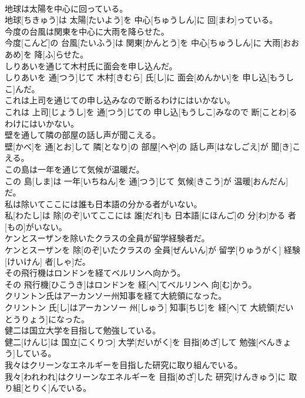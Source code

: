\documentclass[8pt]{extreport}
\begin{document}
\begin{CJK}{UTF8}{min}
\\	地球は太陽を中心に回っている。	
\\	地球[ちきゅう]は 太陽[たいよう]を 中心[ちゅうしん]に 回[まわ]っている。
\\	今度の台風は関東を中心に大雨を降らせた。	
\\	今度[こんど]の 台風[たいふう]は 関東[かんとう]を 中心[ちゅうしん]に 大雨[おおあめ]を 降[ふ]らせた。
\\	しりあいを通じて木村氏に面会を申し込んだ。	
\\	しりあいを 通[つう]じて 木村[きむら] 氏[し]に 面会[めんかい]を 申し込[もうしこ]んだ。
\\	これは上司を通じての申し込みなので断るわけにはいかない。	
\\	これは 上司[じょうし]を 通[つう]じての 申し込[もうしこ]みなので 断[ことわ]るわけにはいかない。
\\	壁を通して隣の部屋の話し声が聞こえる。	
\\	壁[かべ]を 通[とお]して 隣[となり]の 部屋[へや]の 話し声[はなしごえ]が 聞[き]こえる。
\\	この島は一年を通じて気候が温暖だ。	
\\	この 島[しま]は 一年[いちねん]を 通[つう]じて 気候[きこう]が 温暖[おんだん]だ。
\\	私は除いてここには誰も日本語の分かる者がいない。	
\\	私[わたし]は 除[のぞ]いてここには 誰[だれ]も 日本語[にほんご]の 分[わ]かる 者[もの]がいない。
\\	ケンとスーザンを除いたクラスの全員が留学経験者だ。	
\\	ケンとスーザンを 除[のぞ]いたクラスの 全員[ぜんいん]が 留学[りゅうがく] 経験[けいけん] 者[しゃ]だ。
\\	その飛行機はロンドンを経てベルリンへ向かう。	
\\	その 飛行機[ひこうき]はロンドンを 経[へ]てベルリンへ 向[む]かう。
\\	クリントン氏はアーカンソー州知事を経て大統領になった。	
\\	クリントン 氏[し]はアーカンソー 州[しゅう] 知事[ちじ]を 経[へ]て 大統領[だいとうりょう]になった。
\\	健二は国立大学を目指して勉強している。	
\\	健二[けんじ]は 国立[こくりつ] 大学[だいがく]を 目指[めざ]して 勉強[べんきょう]している。
\\	我々はクリーンなエネルギーを目指した研究に取り組んでいる。	
\\	我々[われわれ]はクリーンなエネルギーを 目指[めざ]した 研究[けんきゅう]に 取り組[とりく]んでいる。

\end{CJK}
\end{document}
